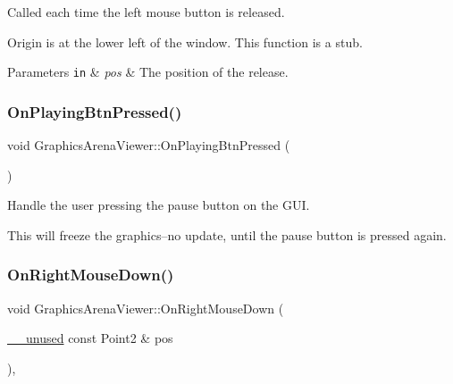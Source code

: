 Called each time the left mouse button is released. 

Origin is at the lower left of the window. This function is a stub.


\begin{DoxyParams}[1]{Parameters}
\mbox{\tt in}  & {\em pos} & The position of the release. \\
\hline
\end{DoxyParams}
\mbox{\label{class_graphics_arena_viewer_a7cc65fd0e2e8c1f6138608e398c7c887}} 
\subsubsection{\texorpdfstring{On\+Playing\+Btn\+Pressed()}{OnPlayingBtnPressed()}}
{\footnotesize\ttfamily void Graphics\+Arena\+Viewer\+::\+On\+Playing\+Btn\+Pressed (\begin{DoxyParamCaption}{ }\end{DoxyParamCaption})}



Handle the user pressing the pause button on the G\+UI. 

This will freeze the graphics--no update, until the pause button is pressed again. \mbox{\label{class_graphics_arena_viewer_a178a9f09ff241d4dc032b6d0998cc9c6}} 
\subsubsection{\texorpdfstring{On\+Right\+Mouse\+Down()}{OnRightMouseDown()}}
{\footnotesize\ttfamily void Graphics\+Arena\+Viewer\+::\+On\+Right\+Mouse\+Down (\begin{DoxyParamCaption}\item[{\mbox{\hyperlink{common_8h_a2e3484535ee610c8e19e9859563abe48}{\+\_\+\+\_\+unused}} const Point2 \&}]{pos }\end{DoxyParamCaption})\hspace{0.3cm}{\ttfamily [inline]}, {\ttfamily [override]}}



